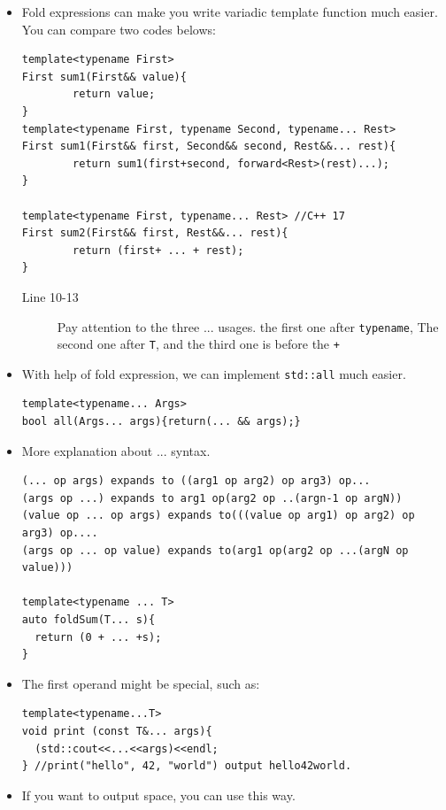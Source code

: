 \documentclass[a4paper,11pt,twoside]{book}
\begin{document}
\begin{itemize}

    \item Fold expressions can make you write variadic template function much easier. You can compare two codes belows:

\begin{lstlisting}
template<typename First>
First sum1(First&& value){
		return value;
}
template<typename First, typename Second, typename... Rest>
First sum1(First&& first, Second&& second, Rest&&... rest){
		return sum1(first+second, forward<Rest>(rest)...);
}

template<typename First, typename... Rest> //C++ 17
First sum2(First&& first, Rest&&... rest){
		return (first+ ... + rest);
}
\end{lstlisting}
\begin{description}
	\item[Line 10-13] Pay attention to the three ... usages. the first one after \texttt{typename}, The second one after \texttt{T}, and the third one is before the \texttt{+}
\end{description}	

    \item With help of fold expression, we can implement \texttt{std::all} much easier.
\begin{lstlisting}
template<typename... Args>
bool all(Args... args){return(... && args);}
\end{lstlisting}

    \item More explanation about ... syntax.
\begin{lstlisting}
(... op args) expands to ((arg1 op arg2) op arg3) op...
(args op ...) expands to arg1 op(arg2 op ..(argn-1 op argN))
(value op ... op args) expands to(((value op arg1) op arg2) op arg3) op....
(args op ... op value) expands to(arg1 op(arg2 op ...(argN op value)))

template<typename ... T>
auto foldSum(T... s){
  return (0 + ... +s); 
} 
\end{lstlisting}
    \item The first operand might be special, such as:
\begin{lstlisting}
template<typename...T>
void print (const T&... args){
  (std::cout<<...<<args)<<endl;
} //print("hello", 42, "world") output hello42world.
\end{lstlisting}

    \item If you want to output space, you can use this way.


\end{itemize}
\end{document}
